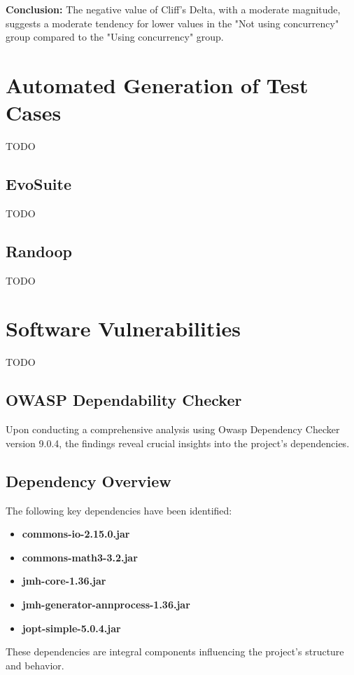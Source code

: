 \documentclass[sigconf]{acmart}
\begin{document}
\textbf{Conclusion:}
The negative value of Cliff's Delta, with a moderate magnitude, suggests a moderate tendency for lower values in the "Not using concurrency" group compared to the "Using concurrency" group.



\section{Automated Generation of Test Cases}
TODO

\subsection{EvoSuite}
TODO

\subsection{Randoop}
TODO

\section{Software Vulnerabilities}
TODO

\subsection{OWASP Dependability Checker}
Upon conducting a comprehensive analysis using Owasp Dependency Checker\cite{owasp-dependency-check} version 9.0.4, the findings reveal crucial insights into the project's dependencies.

\subsection{Dependency Overview}

The following key dependencies have been identified:

\begin{itemize}
    \item \textbf{commons-io-2.15.0.jar}
    \item \textbf{commons-math3-3.2.jar}
    \item \textbf{jmh-core-1.36.jar}
    \item \textbf{jmh-generator-annprocess-1.36.jar}
    \item \textbf{jopt-simple-5.0.4.jar}
\end{itemize}

These dependencies are integral components influencing the project's structure and behavior.
\end{document}
